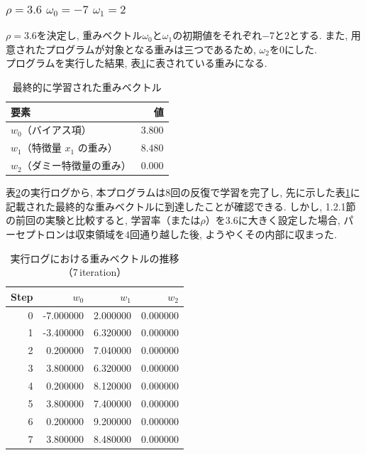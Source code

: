 \documentclass[a4j, 12pt]{jarticle}
\begin{document}
\subsubsection{$\rho=3.6$ $\omega_0=-7$ $\omega_1=2$}
$\rho=3.6$を決定し, 重みベクトル$\omega_0$と$\omega_1$の初期値をそれぞれ$-7$と$2$とする. また, 用意されたプログラムが対象となる重みは三つであるため, $\omega_2$を0にした. \\
プログラムを実行した結果, 表\ref{p36finalweights}に表されている重みになる. 
\begin{table}[H]
  \centering
  \caption{最終的に学習された重みベクトル}\label{p36finalweights}
  \begin{tabular}{l r}
    \hline
    要素 & 値 \\
    \hline
    $w_0$（バイアス項） & $3.800$ \\
    $w_1$（特徴量 $x_1$ の重み） & $8.480$ \\
    $w_2$（ダミー特徴量の重み）   & $0.000$ \\
    \hline
  \end{tabular}
\end{table}
表\ref{p36logs}の実行ログから, 本プログラムは8回の反復で学習を完了し, 先に示した表\ref{p36finalweights}に記載された最終的な重みベクトルに到達したことが確認できる. しかし, 1.2.1節の前回の実験と比較すると, 学習率（または$\rho$）を$3.6$に大きく設定した場合, パーセプトロンは収束領域を$4$回通り越した後, ようやくその内部に収まった. 
\begin{table}[H]
  \centering
  \caption{実行ログにおける重みベクトルの推移（7\,iteration）}\label{p36logs}
  \begin{tabular}{r|rrr}
    \hline
    Step & $w_0$ & $w_1$ & $w_2$ \\
    \hline
     0 & -7.000000 & 2.000000 & 0.000000 \\
     1 & -3.400000 & 6.320000 & 0.000000 \\
     2 &  0.200000 & 7.040000 & 0.000000 \\
     3 &  3.800000 & 6.320000 & 0.000000 \\
     4 &  0.200000 & 8.120000 & 0.000000 \\
     5 &  3.800000 & 7.400000 & 0.000000 \\
     6 &  0.200000 & 9.200000 & 0.000000 \\
     7 &  3.800000 & 8.480000 & 0.000000 \\
    \hline
  \end{tabular}
\end{table}
\end{document}
